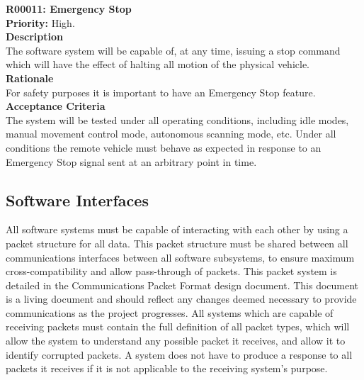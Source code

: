 \documentclass[main.tex]{subfiles}
\begin{document}
\begin{appendices}
\textbf{R00011: Emergency Stop}\\
\textbf{Priority: }High.\\
\textbf{Description}\\
The software system will be capable of, at any time, issuing a stop command which will have the effect of halting all motion of the physical vehicle.\\
\textbf{Rationale}\\
For safety purposes it is important to have an Emergency Stop feature.\\
\textbf{Acceptance Criteria}\\
The system will be tested under all operating conditions, including idle modes, manual movement control mode, autonomous scanning mode, etc. Under all conditions the remote vehicle must behave as expected in response to an Emergency Stop signal sent at an arbitrary point in time.\\


\subsection{Software Interfaces}
All software systems must be capable of interacting with each other by using a packet structure for all data. This packet structure must be shared between all communications interfaces between all software subsystems, to ensure maximum cross-compatibility and allow pass-through of packets. This packet system is detailed in the Communications Packet Format design document. This document is a living document and should reflect any changes deemed necessary to provide communications as the project progresses. All systems which are capable of receiving packets must contain the full definition of all packet types, which will allow the system to understand any possible packet it receives, and allow it to identify corrupted packets. A system does not have to produce a response to all packets it receives if it is not applicable to the receiving system's purpose. 


\end{appendices}
\end{document}
